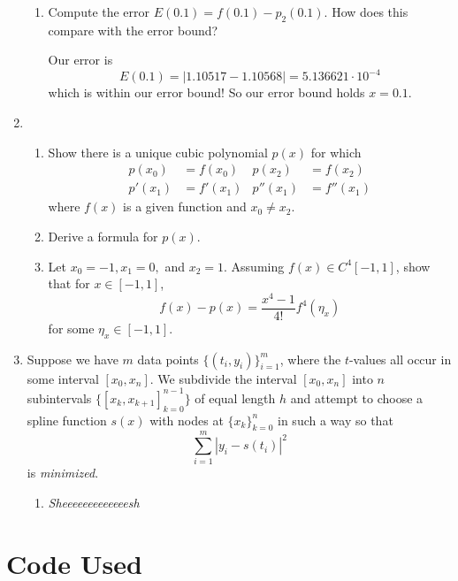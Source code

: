 \documentclass[a4paper,12pt]{article}
\newcommand{\abs}[1]{\left| #1 \right|}
\begin{document}
\begin{enumerate}[label = \arabic*.]
\begin{enumerate}[label = (\roman*)]
			\item Compute the error $ E(0.1) = f(0.1) - p_2(0.1) $. How does this compare with the error bound?
			
			Our error is
			\[
				E(0.1) = \abs{1.10517 - 1.10568} = 5.136621 \cdot 10^{-4}
			\]
			which is within our error bound! So our error bound holds $ x = 0.1 $.
		\end{enumerate}

	\item \
		\begin{enumerate}[label = (\roman*)]
			\item Show there is a unique cubic polynomial $ p(x) $ for which 
			\begin{align*}
				p(x_0) &= f(x_0) & p(x_2) &= f(x_2) \\
				p'(x_1) &= f'(x_1) & p''(x_1) &= f''(x_1)
			\end{align*}
			where $ f(x) $ is a given function and $ x_0 \neq x_2 $.
			
			\item Derive a formula for $ p(x) $.
			
			\item Let $ x_0 = -1, x_1 = 0, $ and $ x_2 = 1 $. Assuming $ f(x) \in C^4[-1,1] $, show that for $ x \in [-1,1] $,
			\[
				f(x) - p(x) = \frac{x^4 - 1}{4!}f^4(\eta_x)
			\]
			for some $ \eta_x \in [-1,1] $.
		\end{enumerate}
	
	\item Suppose we have $ m $ data points $ \{(t_i, y_i)\}_{i = 1}^m $, where the $ t $-values all occur in some interval $ [x_0, x_n] $. We subdivide the interval $ [x_0, x_n] $ into $ n $ subintervals $ \{[x_k, x_{k + 1}]_{k = 0}^{n - 1}\} $ of equal length $ h $ and attempt to choose a spline function $ s(x) $ with nodes at $ \{x_k\}_{k = 0}^n $ in such a way so that
	\[
		\sum_{i = 1}^{m} \abs{y_i - s(t_i)}^2
	\]
	is \emph{minimized}.
		\begin{enumerate}[label = (\roman*)]
			\item \emph{Sheeeeeeeeeeeeesh}
		\end{enumerate}
\end{enumerate}

\section*{Code Used}
\end{document}

